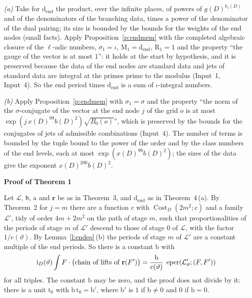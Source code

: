 \documentclass[11pt,a4paper]{article}
\makeatletter
\newcommand{\sect}[2]{\refstepcounter{section}\label{#2}\par\addvspace{19pt plus 4pt minus 2pt}\Needspace{7\baselineskip}%
  \noindent\llap{{\fontsize{13.2}{16}\selectfont\bfseries\color{inkfaint}\thesection}\hspace{9pt}}%
  {\fontsize{13.2}{16}\selectfont\bfseries\color{ink}#1}\par\nopagebreak\vspace{-1pt}}
\theoremstyle{plainx}
\theoremstyle{uprightx}
\renewenvironment{proof}[1][Proof]{\par\pushQED{\qed}\normalfont\topsep0pt\partopsep0pt
  \trivlist\item[\hskip\labelsep\itshape #1.]\ignorespaces}{\popQED\endtrivlist\@endpefalse}
\newcommand{\sh}{\mathsf{h}}
\newcommand{\rc}{\mathrm{c}}
\newcommand{\cL}{\mathcal{L}}
\newcommand{\Cost}[3]{\operatorname{Cost}_{#1}(#2;#3)}
\makeatother
\begin{document}
\begin{proof}[Proof of Theorem 4]
\emph{(a)} Take for $\mathrm{d}_{\mathrm{end}}$ the product, over the infinite places, of powers of $g(D)^{b_1(D)}$ and of the
denominators of the branching data, times a power of the denominator of the dual pairing; its size is bounded by
the bounds for the weights of the end nodes (small facts). Apply Proposition~\ref{p:endmem} with the completed
algebraic closure of the $\ell$-adic numbers, $\sigma_1=\iota$, $\mathrm{M}_1=\mathrm{d}_{\mathrm{end}}$, $\mathrm{R}_1=1$ and the property ``the gauge
of the vector is at most $1$'': it holds at the start by hypothesis, and it is preserved because the data of the
end nodes are standard data and jets of standard data are integral at the primes prime to the modulus (Input~1,
Input~4). So the end period times $\mathrm{d}_{\mathrm{end}}$ is a sum of $\iota$-integral numbers.

\emph{(b)} Apply Proposition~\ref{p:endmem} with $\sigma_1=\sigma$ and the property ``the norm of the
$\sigma$-conjugate of the vector at the end node $j$ of the grid $o$ is at most
$\exp(j\,x(D)^{99}b(D)^2)\sqrt{B_0(o)}$'', which is preserved by the bounds for the conjugates of jets of admissible
combinations (Input~4). The number of terms is bounded by the tuple bound to the power of the order and by the
class numbers of the end levels, each at most $\exp(x(D)^{99}b(D)^2)$; the sizes of the data give the exponent
$x(D)^{200}b(D)^2$.
\end{proof}

\sect{Proof of Theorem 1}{s:proof}
Let $\cL$, $\sh$, $\mathrm{a}$ and $\mathbf{r}$ be as in Theorem~3, and $\mathrm{d}_{\mathrm{end}}$ as in Theorem~4\,(a). By
Theorem~2 for $j=m$ there are a function $\rc$ with $\Cost{D}{2m^2}{\rc}$ and a family $\cL'$, tidy of order
$4m+2m^2$ on the path of stage $m$, such that proportionalities of the periods of stage $m$ of $\cL'$ descend to
those of stage $0$ of $\cL$, with the factor $1/\rc(\vartheta)$. By Lemma~\ref{l:endeq}\,(b) the periods of stage
$m$ of $\cL'$ are a constant multiple of the end periods. So there is a constant $\mathrm{b}$ with
\[\mathrm{i}_D(\vartheta)\int F\cdot\bigl(\text{chain of lifts of }\mathbf{r}(F')\bigr)
=\frac{\mathrm{b}}{\rc(\vartheta)}\;\finPeriod{\cL'_\vartheta}{(F,F')}\]
for all triples. The constant $\mathrm{b}$ may be zero, and the proof does not divide by it: there is a unit
$\mathrm{t}_0$ with $\mathrm{b}\,\mathrm{t}_0=\mathrm{b}'$, where $\mathrm{b}'$ is $1$ if $\mathrm{b}\ne0$ and $0$ if
$\mathrm{b}=0$.
\end{document}
